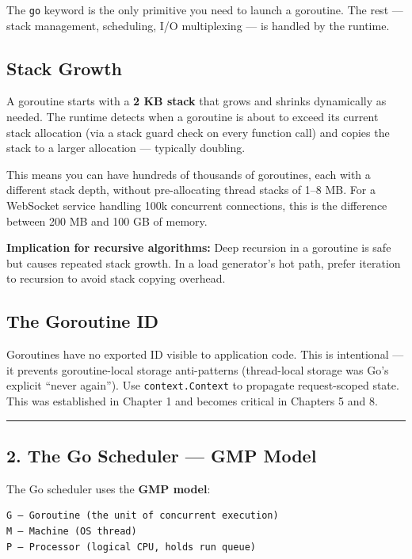\documentclass[11pt,a4paper,oneside]{book}
\begin{document}
The \texttt{go} keyword is the only primitive you need to launch a
goroutine. The rest --- stack management, scheduling, I/O multiplexing
--- is handled by the runtime.

\subsection{Stack Growth}

A goroutine starts with a \textbf{2 KB stack} that grows and shrinks
dynamically as needed. The runtime detects when a goroutine is about to
exceed its current stack allocation (via a stack guard check on every
function call) and copies the stack to a larger allocation --- typically
doubling.

This means you can have hundreds of thousands of goroutines, each with a
different stack depth, without pre-allocating thread stacks of 1--8 MB.
For a WebSocket service handling 100k concurrent connections, this is
the difference between 200 MB and 100 GB of memory.

\textbf{Implication for recursive algorithms:} Deep recursion in a
goroutine is safe but causes repeated stack growth. In a load
generator's hot path, prefer iteration to recursion to avoid stack
copying overhead.

\subsection{The Goroutine ID}

Goroutines have no exported ID visible to application code. This is
intentional --- it prevents goroutine-local storage anti-patterns
(thread-local storage was Go's explicit ``never again''). Use
\texttt{context.Context} to propagate request-scoped state. This was
established in Chapter 1 and becomes critical in Chapters 5 and 8.

\begin{center}\rule{0.5\linewidth}{0.5pt}\end{center}

\subsection{2. The Go Scheduler --- GMP
Model}

The Go scheduler uses the \textbf{GMP model}:

\begin{verbatim}
G — Goroutine (the unit of concurrent execution)
M — Machine (OS thread)
P — Processor (logical CPU, holds run queue)
\end{verbatim}
\end{document}
